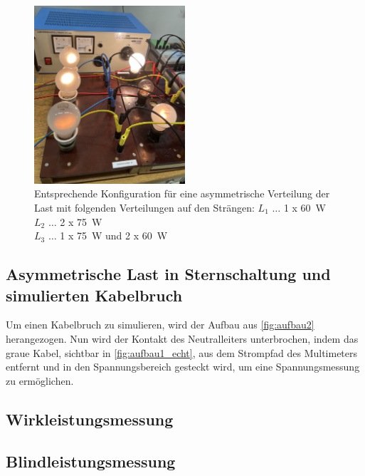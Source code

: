\documentclass[12pt,english,ngerman]{scrartcl}
\begin{document}
\begin{figure}[H]
	\begin{center}
		\includegraphics[width = 0.5\textwidth]{./figures/lampen.png}
	\end{center}
	\caption[Entsprechende Konfiguration für eine asymmetrische Verteilung der Last]
	{Entsprechende Konfiguration für eine asymmetrische Verteilung der Last mit folgenden Verteilungen auf den Strängen:
	$L_1$ \(\dots\) 1 x \SI[]{60}{\watt} \\
	$L_2$ \(\dots\) 2 x \SI[]{75}{\watt} \\
	$L_3$ \(\dots\) 1 x \SI[]{75}{\watt} und 2 x \SI[]{60}{\watt}
	}\label{fig:lampenasym}
\end{figure}

\subsection{Asymmetrische Last in Sternschaltung und simulierten Kabelbruch}


Um einen Kabelbruch zu simulieren, wird der Aufbau aus \autoref{fig:aufbau2} herangezogen. Nun wird der Kontakt 
des Neutralleiters unterbrochen, indem das graue Kabel, sichtbar in \autoref{fig:aufbau1_echt}, aus dem 
Strompfad des Multimeters entfernt und in den Spannungsbereich gesteckt wird, um eine Spannungsmessung zu ermöglichen.



\subsection{Wirkleistungsmessung}



\subsection{Blindleistungsmessung}
\end{document}
